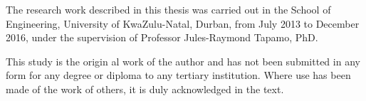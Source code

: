 \documentclass[
11pt, %
english, %
singlespacing, %
liststotoc, %
headsepline, %
]{MastersDoctoralThesis} %
\begin{document}

\begin{preface}
	\addchaptertocentry{\prefacename} %
	
	The research work described in this thesis was carried out in the School of Engineering, University of KwaZulu-Natal, Durban, from July 2013 to December 2016, under the supervision of Professor Jules-Raymond Tapamo, PhD.
	
	This study is the origin al work of the author and has not been submitted in any form for any degree or diploma to any tertiary institution. Where use has been made of the work of others, it is duly acknowledged in the text.
	
\end{preface}


%
%
% 
% 
%
\end{document}
